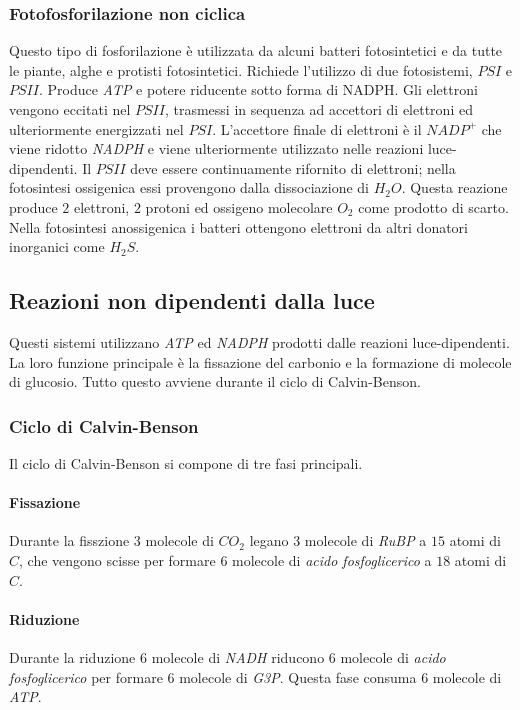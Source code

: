 		\subsubsection{Fotofosforilazione non ciclica}
		Questo tipo di fosforilazione \`e utilizzata da alcuni  batteri fotosintetici e da tutte le piante, alghe e protisti fotosintetici. 
		Richiede l'utilizzo di due fotosistemi, $PSI$ e $PSII$.
		Produce \emph{ATP} e potere riducente sotto forma di NADPH. 
		Gli elettroni vengono eccitati nel $PSII$, trasmessi in sequenza ad accettori di elettroni ed ulteriormente energizzati nel $PSI$. 
		L'accettore finale di elettroni \`e il \emph{$NADP^+$} che viene ridotto \emph{NADPH} e viene ulteriormente utilizzato nelle reazioni luce-dipendenti. 
		Il $PSII$ deve essere continuamente rifornito di elettroni; nella fotosintesi ossigenica essi provengono dalla dissociazione di \emph{$H_2O$}. 
		Questa reazione produce $2$ elettroni, $2$ protoni ed ossigeno molecolare \emph{$O_2$} come prodotto di scarto. 
		Nella fotosintesi anossigenica i batteri ottengono elettroni da altri donatori inorganici come \emph{$H_2S$}.

	\subsection{Reazioni non dipendenti dalla luce}
	Questi sistemi utilizzano \emph{ATP} ed \emph{NADPH} prodotti dalle reazioni luce-dipendenti. 
	La loro funzione principale \`e la fissazione del carbonio e la formazione di molecole di glucosio. 
	Tutto questo avviene durante il ciclo di Calvin-Benson. 

		\subsubsection{Ciclo di Calvin-Benson}
		Il ciclo di Calvin-Benson si compone di tre fasi principali.

			\paragraph{Fissazione}
			Durante la fisszione $3$ molecole di \emph{$CO_2$} legano $3$ molecole di \emph{RuBP} a $15$ atomi di $C$, che vengono scisse per formare $6$ molecole di \emph{acido fosfoglicerico} a $18$ atomi di $C$.

			\paragraph{Riduzione}
			Durante la riduzione $6$ molecole di \emph{NADH} riducono $6$ molecole di \emph{acido fosfoglicerico} per formare $6$ molecole di \emph{G3P}. 
			Questa fase consuma $6$ molecole di \emph{ATP}.


